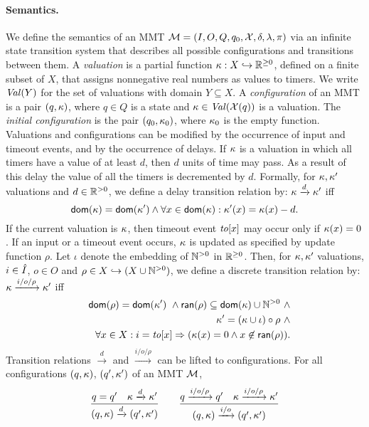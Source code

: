 \paragraph{Semantics.}
We define the semantics of an MMT ${\mathcal M} = (I, O, Q, q_0, \mathcal{X}, \delta, \lambda, \pi)$ 
via an infinite state transition system that describes all possible
configurations and transitions between them.
A \emph{valuation} is a partial function
$\kappa : X \hookrightarrow {\mathbb R}^{\geq 0}$, defined on a finite subset of $X$, that assigns nonnegative real numbers as values to timers.
We write $\mathit{Val}({Y})$ for the set of valuations with domain $Y \subseteq X$.
A \emph{configuration} of an MMT is a pair $(q,\kappa)$, where $q \in Q$ is a state and $\kappa\in\mathit{Val}({\mathcal{X}(q)})$ is a valuation.
The \emph{initial configuration} is the pair $(q_0, \kappa_0)$, where $\kappa_0$ is the empty function.
Valuations and configurations can be modified by the occurrence of input and timeout events, and by
the occurrence of delays.
If $\kappa$ is a valuation in which all timers
have a value of at least $d$, then $d$ units of time may pass. As a result of this delay the value of all the timers is decremented by $d$.
Formally, for $\kappa, \kappa'$ valuations and $d \in {\mathbb R}^{> 0}$, we define a delay transition relation by: $\kappa \xrightarrow{d} \kappa'$ iff
\[
{\textsf{dom}}(\kappa) = {\textsf{dom}}(\kappa') \wedge \forall x \in{\textsf{dom}}(\kappa) : \kappa'(x) = \kappa(x) - d .
\]
If the current valuation is $\kappa$, then timeout event $\mathit{to}[x]$ may occur only if $\kappa(x)=0$.
If an input or a timeout event occurs, $\kappa$ is updated as specified by update function $\rho$.
Let $\iota$ denote the embedding of ${\mathbb N}^{>0}$ in ${\mathbb R}^{\geq 0}$.
Then, for $\kappa, \kappa'$ valuations, $i \in \hat{I}$, $o \in O$ and $\rho \in X \hookrightarrow (X \cup {\mathbb N}^{>0})$,
we define a discrete transition relation by: $\kappa \xrightarrow{i/o/\rho}  \kappa'$ iff
\begin{eqnarray*}
&& {\textsf{dom}}(\rho) = {\textsf{dom}}(\kappa') ~ \wedge {\textsf{ran}}(\rho) \subseteq {\textsf{dom}}(\kappa) \cup {\mathbb N}^{>0} ~ \wedge\\
&&\kappa' = (\kappa \cup \iota) \circ \rho ~ \wedge\\
&& \forall x \in X : i=\mathit{to}[x] \Rightarrow (\kappa(x) = 0 \wedge x \not\in {\textsf{ran}}(\rho)).
\end{eqnarray*}
Transition relations $\xrightarrow{d}$ and $\xrightarrow{i/o/\rho}$ can be lifted to configurations.
For all configurations $(q, \kappa)$, $(q', \kappa')$ of an MMT ${\mathcal M}$,
\[
\frac{q = q' \quad \kappa \xrightarrow{d} \kappa'}{(q,\kappa) \xrightarrow{d} (q',\kappa')}
\quad\quad
  \frac{q \xrightarrow{i/o/\rho} q' \quad \kappa \xrightarrow{i/o/\rho} \kappa'}{(q,\kappa) \xrightarrow{i/o} (q',\kappa')}
\]
